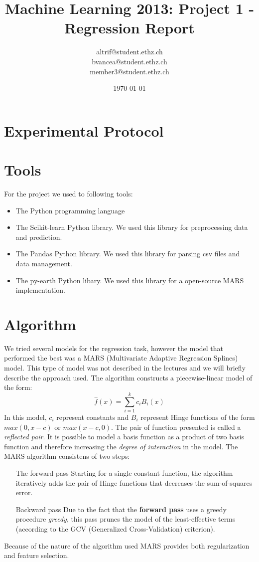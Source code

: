 \documentclass[a4paper, 11pt]{article}
\title{Machine Learning 2013: Project 1 - Regression Report}
\author{altrif@student.ethz.ch\\ bvancea@student.ethz.ch\\ member3@student.ethz.ch\\}
\date{\today}
\begin{document}
\maketitle

\section*{Experimental Protocol}
\section{Tools}

For the project we used to following tools:
    \begin{itemize}
        \item The Python programming language
        \item The Scikit-learn Python library. We used this library for preprocessing data and prediction.
        \item The Pandas Python library. We used this library for parsing csv files and data management.
        \item The py-earth Python libary. We used this library for a open-source MARS implementation.
    \end{itemize}

\section{Algorithm}
We tried several models for the regression task, however the model that performed the best was a MARS (Multivariate Adaptive Regression Splines) model. This type of model was not described in the lectures and we will briefly describe the approach used. 
The algorithm constructs a piecewise-linear model of the form:
\begin{equation}
    \hat{f}{(x)} = \sum_{i=1}^{k}{c_iB_i(x)}
\end{equation}
In this model, $c_i$ represent constants and $B_i$ represent Hinge functions of the form $max(0,x-c)$ or $max(x-c,0)$. The pair of function presented is called a \emph{reflected pair}. It is possible to model a basis function as a product of two basis function and therefore increasing the \emph{degree of interaction} in the model. The MARS algorithm consistens of two steps:
\begin{enumerate}
\item[The forward pass] Starting for a single constant function, the algorithm iteratively adds the pair of Hinge functions that decreases the sum-of-squares error.
\item[Backward pass] Due to the fact that the \textbf{forward pass} uses a greedy procedure \emph{greedy}, this pass prunes the model of the least-effective terms (according to the GCV (Generalized Cross-Validation) criterion).
\end{enumerate}
Because of the nature of the algorithm used MARS provides both regularization and feature selection.
\end{document}

